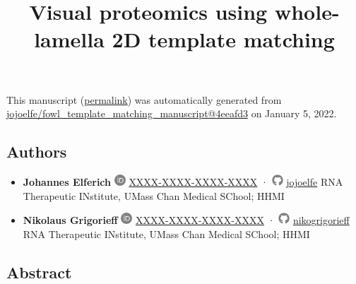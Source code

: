 \documentclass[
]{article}
\title{Visual proteomics using whole-lamella 2D template matching}
\author{}
\date{}
\begin{document}
\maketitle

This manuscript
(\href{https://jojoelfe.github.io/fowl_template_matching_manuscript/v/4eeafd31bd521c439395837768989d548d581f72/}{permalink})
was automatically generated
from \href{https://github.com/jojoelfe/fowl_template_matching_manuscript/tree/4eeafd31bd521c439395837768989d548d581f72}{jojoelfe/fowl\_template\_matching\_manuscript@4eeafd3}
on January 5, 2022.

\hypertarget{authors}{%
\subsection{Authors}\label{authors}}

\begin{itemize}
\item
  \textbf{Johannes Elferich}
  \includegraphics[width=0.16667in,height=0.16667in]{images/orcid.pdf}
  \href{https://orcid.org/XXXX-XXXX-XXXX-XXXX}{XXXX-XXXX-XXXX-XXXX}
  · \includegraphics[width=0.16667in,height=0.16667in]{images/github.pdf}
  \href{https://github.com/jojoelfe}{jojoelfe}
  RNA Therapeutic INstitute, UMass Chan Medical SChool; HHMI
\item
  \textbf{Nikolaus Grigorieff}
  \includegraphics[width=0.16667in,height=0.16667in]{images/orcid.pdf}
  \href{https://orcid.org/XXXX-XXXX-XXXX-XXXX}{XXXX-XXXX-XXXX-XXXX}
  · \includegraphics[width=0.16667in,height=0.16667in]{images/github.pdf}
  \href{https://github.com/nikogrigorieff}{nikogrigorieff}
  RNA Therapeutic INstitute, UMass Chan Medical SChool; HHMI
\end{itemize}

\hypertarget{abstract}{%
\subsection{Abstract}\label{abstract}}
\end{document}
